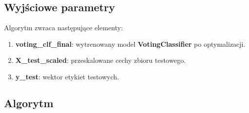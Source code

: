 \subsection{Wyjściowe parametry}
Algorytm zwraca następujące elementy:

\begin{enumerate}
	\def\labelenumi{\arabic{enumi}.}
	\item \textbf{voting\_clf\_final}: wytrenowany model \textbf{VotingClassifier} po optymalizacji.
	\item \textbf{X\_test\_scaled}: przeskalowane cechy zbioru testowego.
	\item \textbf{y\_test}: wektor etykiet testowych.
\end{enumerate}

\subsection{Algorytm}
